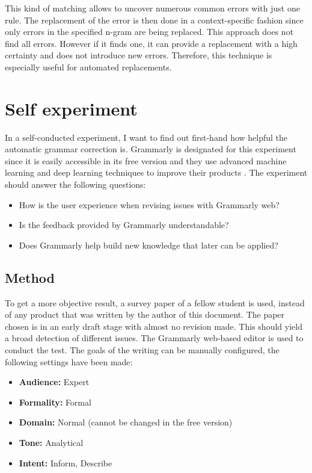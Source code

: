 \documentclass[runningheads]{llncs}
\let\OldTextregistered\textregistered
\renewcommand{\textregistered}{\OldTextregistered\xspace}
\begin{document}
This kind of matching allows to uncover numerous common errors with just one rule. The replacement of the error is then done in a context-specific fashion since only errors in the specified n-gram are being replaced. This approach does not find all errors. However if it finds one, it can provide a replacement with a high certainty and does not introduce new errors. Therefore, this technique is especially useful for automated replacements.


\section{Self experiment}
In a self-conducted experiment, I want to find out first-hand how helpful the automatic grammar correction is. Grammarly\textregistered is designated for this experiment since it is easily accessible in its free version and they use advanced machine learning and deep learning techniques to improve their products \citep{noauthor_grammarly_nodate}. The experiment should answer the following questions:

\begin{itemize}
 \item How is the user experience when revising issues with Grammarly\textregistered web?
 \item Is the feedback provided by Grammarly\textregistered understandable?
 \item Does Grammarly\textregistered help build new knowledge that later can be applied?
\end{itemize}


\subsection{Method}
To get a more objective result, a survey paper of a fellow student is used, instead of any product that was written by the author of this document. The paper chosen is in an early draft stage with almost no revision made. This should yield a broad detection of different issues. The Grammarly\textregistered web-based editor is used to conduct the test. The goals of the writing can be manually configured, the following settings have been made:

\begin{itemize}
 \item \textbf{Audience:} Expert
 \item \textbf{Formality:} Formal
 \item \textbf{Domain:} Normal (cannot be changed in the free version)
 \item \textbf{Tone:} Analytical
 \item \textbf{Intent:} Inform, Describe
\end{itemize}
\end{document}
